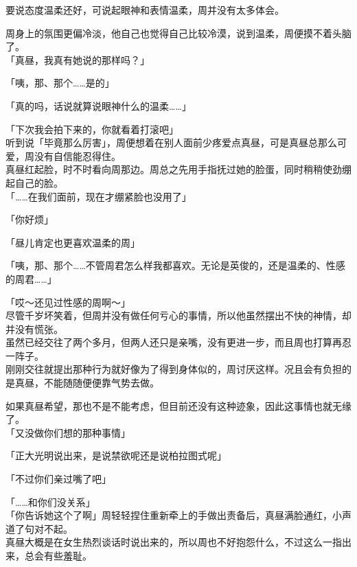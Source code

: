 要说态度温柔还好，可说起眼神和表情温柔，周并没有太多体会。

周身上的氛围更偏冷淡，他自己也觉得自己比较冷漠，说到温柔，周便摸不着头脑了。\\

「真昼，我真有她说的那样吗？」

「咦，那、那个……是的」

「真的吗，话说就算说眼神什么的温柔……」

「下次我会拍下来的，你就看着打滚吧」\\

听到说「毕竟那么厉害」，周便想着在别人面前少疼爱点真昼，可是真昼总那么可爱，周没有自信能忍得住。\\

真昼红起脸，时不时看向周那边。周总之先用手指抚过她的脸蛋，同时稍稍使劲绷起自己的脸。\\

「……在我们面前，现在才绷紧脸也没用了」

「你好烦」

「昼儿肯定也更喜欢温柔的周」

「咦，那、那个……不管周君怎么样我都喜欢。无论是英俊的，还是温柔的、性感的周君……」

「哎～还见过性感的周啊～」\\

尽管千岁坏笑着，但周并没有做任何亏心的事情，所以他虽然摆出不快的神情，却并没有慌张。\\

虽然已经交往了两个多月，但两人还只是亲嘴，没有更进一步，而且周也打算再忍一阵子。\\

刚刚交往就提出那种行为就好像为了得到身体似的，周讨厌这样。况且会有负担的是真昼，不能随随便便靠气势去做。

如果真昼希望，那也不是不能考虑，但目前还没有这种迹象，因此这事情也就无缘了。\\

「又没做你们想的那种事情」

「正大光明说出来，是说禁欲呢还是说柏拉图式呢」

「不过你们亲过嘴了吧」

「……和你们没关系」\\

「你告诉她这个了啊」周轻轻捏住重新牵上的手做出责备后，真昼满脸通红，小声道了句对不起。\\

真昼大概是在女生热烈谈话时说出来的，所以周也不好抱怨什么，不过这么一指出来，总会有些羞耻。\\

